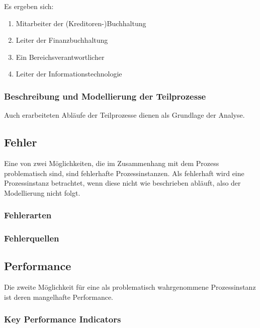 Es ergeben sich:

\begin{enumerate}
\item{Mitarbeiter der (Kreditoren-)Buchhaltung}
\item{Leiter der Finanzbuchhaltung}
\item{Ein Bereichsverantwortlicher}
\item{Leiter der Informationstechnologie}
\end{enumerate}


\subsubsection{Beschreibung und Modellierung der Teilprozesse}

Auch erarbeiteten Abläufe der Teilprozesse dienen als Grundlage der Analyse.


\subsection{Fehler}
Eine von zwei Möglichkeiten, die im Zusammenhang mit dem Prozess problematisch sind, sind fehlerhafte Prozessinstanzen. Als fehlerhaft wird eine Prozessinstanz betrachtet, wenn diese nicht wie beschrieben abläuft, also der Modellierung nicht folgt.
\subsubsection{Fehlerarten}


\subsubsection{Fehlerquellen}


\subsection{Performance}
Die zweite Möglichkeit für eine als problematisch wahrgenommene Prozessinstanz ist deren mangelhafte Performance.

\subsubsection{Key Performance Indicators}

